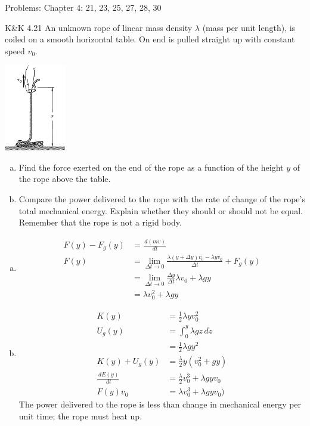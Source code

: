 \documentclass{esg8012pset}
\date{October 22}
\renewcommand{\d}{\,d}
\begin{document}
\noindent Problems: Chapter 4: 21, 23, 25, 27, 28, 30


\begin{problem}{K\&K 4.21}
  An unknown rope of linear mass density $\lambda$ (mass per unit length), is coiled on a smooth horizontal table. On end is pulled straight up with constant speed $v_0$.
  \begin{center}\includegraphics[width=0.2\textwidth]{ps07_1}\end{center}
  \begin{enumerate}[(a)]
  \item Find the force exerted on the end of the rope as a function of the height $y$ of the rope above the table.
    \item Compare the power delivered to the rope with the rate of change of the rope's total mechanical energy. Explain whether they should or should not be equal. Remember that the rope is not a rigid body.
  \end{enumerate}
\end{problem}
\begin{solution}
  \begin{enumerate}[a)]
    \item
  \begin{align*}
    F(y) - F_g(y) & = \frac{\d (m v)}{\d t} \\
    F(y) & = \lim_{\Delta t \rightarrow 0} \frac{\lambda (y+\Delta y) v_0 - \lambda y v_0}{\Delta t} + F_g(y) \\
    & = \lim_{\Delta t \rightarrow 0} \frac{\Delta y}{\Delta t} \lambda v_0 + \lambda g y \\
    & = \lambda v_0^2 + \lambda g y
  \end{align*}
    \item \begin{align*}
    K(y) & = \frac{1}{2}\lambda y v_0^2 \\
    U_g(y) & = \int_{0}^y \lambda g z \d z \\
          & = \frac{1}{2}\lambda g y^2 \\
    K(y) + U_g(y) & = \frac{\lambda}{2} y(v_0^2 + g y) \\
    \frac{\d E(y)}{\d t} & = \frac{\lambda}{2} v_0^3 + \lambda g y v_0 \\
    F(y)v_0 & = \lambda v_0^3 + \lambda g y v_0)
    \end{align*} The power delivered to the rope is less than change in mechanical energy per unit time; the rope must heat up.  %
  \end{enumerate}
\end{solution}
\end{document}
